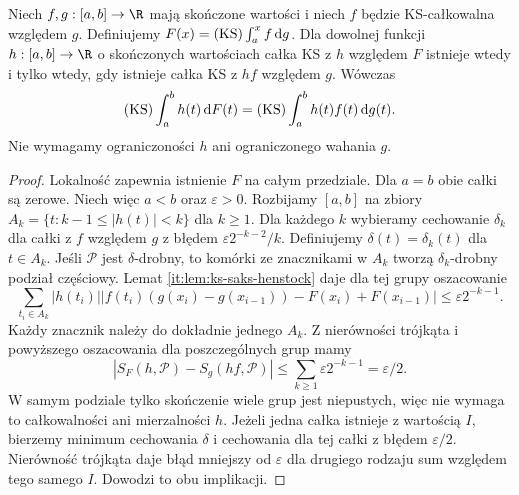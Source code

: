 \begin{twierdzenie}
\label{tw:ks-chain}
Niech $f,g:[a,b]\to\R$ mają skończone wartości i niech
$f$ będzie KS-całkowalna względem $g$. Definiujemy
$F(x)=(\mathrm{KS})\int_a^x f\,\mathrm dg$. Dla dowolnej funkcji
$h:[a,b]\to\R$ o skończonych wartościach całka KS z $h$
względem $F$ istnieje wtedy i tylko wtedy, gdy istnieje
całka KS z $hf$ względem $g$. Wówczas
\[
 (\mathrm{KS})\int_a^b h(t)\,\mathrm dF(t)
 =(\mathrm{KS})\int_a^b h(t)f(t)\,\mathrm dg(t).
\]
Nie wymagamy ograniczoności $h$ ani ograniczonego wahania $g$.
\end{twierdzenie}
\begin{proof}
Lokalność zapewnia istnienie $F$ na całym przedziale.
Dla $a=b$ obie całki są zerowe.
Niech więc $a<b$ oraz $\varepsilon>0$. Rozbijamy $[a,b]$ na zbiory
$A_k=\{t:k-1\le|h(t)|<k\}$ dla $k\ge1$.
Dla każdego $k$ wybieramy cechowanie $\delta_k$ dla
całki z $f$ względem $g$ z błędem
$\varepsilon2^{-k-2}/k$.
Definiujemy $\delta(t)=\delta_k(t)$ dla $t\in A_k$.
Jeśli $\mathcal P$ jest $\delta$-drobny, to komórki
ze znacznikami w $A_k$ tworzą $\delta_k$-drobny
podział częściowy. Lemat \ref{it:lem:ks-saks-henstock}
daje dla tej grupy oszacowanie
\[
 \sum_{t_i\in A_k}|h(t_i)|
 |f(t_i)(g(x_i)-g(x_{i-1}))-F(x_i)+F(x_{i-1})|
 \le\varepsilon2^{-k-1}.
\]
Każdy znacznik należy do dokładnie jednego $A_k$.
Z nierówności trójkąta i powyższego oszacowania
dla poszczególnych grup mamy
\[
 |S_F(h,\mathcal P)-S_g(hf,\mathcal P)|
 \le\sum_{k\ge1}\varepsilon 2^{-k-1}=\varepsilon/2.
\]
W samym podziale tylko skończenie wiele grup jest
niepustych, więc nie wymaga to całkowalności ani
mierzalności $h$.
Jeżeli jedna całka istnieje z wartością $I$, bierzemy
minimum cechowania $\delta$ i cechowania dla tej całki
z błędem $\varepsilon/2$. Nierówność trójkąta daje
błąd mniejszy od $\varepsilon$ dla drugiego rodzaju sum
względem tego samego $I$. Dowodzi to obu implikacji.
\end{proof}

